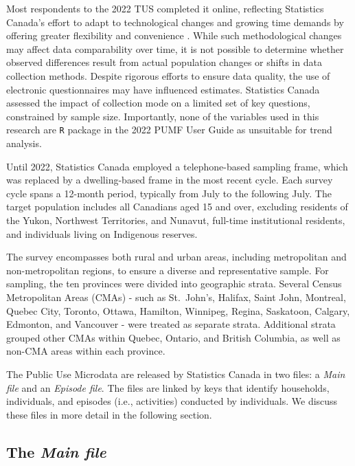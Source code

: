 \documentclass[Royal,times,sageh]{sagej}
\begin{document}
Most respondents to the 2022 TUS completed it online, reflecting
Statistics Canada's effort to adapt to technological changes and growing
time demands by offering greater flexibility and convenience
\citep{statisticscanada2022}. While such methodological changes may
affect data comparability over time, it is not possible to determine
whether observed differences result from actual population changes or
shifts in data collection methods. Despite rigorous efforts to ensure
data quality, the use of electronic questionnaires may have influenced
estimates. Statistics Canada assessed the impact of collection mode on a
limited set of key questions, constrained by sample size. Importantly,
none of the variables used in this research are \texttt{R} package in
the 2022 PUMF User Guide as unsuitable for trend analysis.

Until 2022, Statistics Canada employed a telephone-based sampling frame,
which was replaced by a dwelling-based frame in the most recent cycle.
Each survey cycle spans a 12-month period, typically from July to the
following July. The target population includes all Canadians aged 15 and
over, excluding residents of the Yukon, Northwest Territories, and
Nunavut, full-time institutional residents, and individuals living on
Indigenous reserves.

The survey encompasses both rural and urban areas, including
metropolitan and non-metropolitan regions, to ensure a diverse and
representative sample. For sampling, the ten provinces were divided into
geographic strata. Several Census Metropolitan Areas (CMAs) - such as
St.~John's, Halifax, Saint John, Montreal, Quebec City, Toronto, Ottawa,
Hamilton, Winnipeg, Regina, Saskatoon, Calgary, Edmonton, and Vancouver
- were treated as separate strata. Additional strata grouped other CMAs
within Quebec, Ontario, and British Columbia, as well as non-CMA areas
within each province.

The Public Use Microdata are released by Statistics Canada in two files:
a \emph{Main file} and an \emph{Episode file}. The files are linked by
keys that identify households, individuals, and episodes (i.e.,
activities) conducted by individuals. We discuss these files in more
detail in the following section.

\subsection{\texorpdfstring{The \emph{Main
file}}{The Main file}}\label{the-main-file}
\end{document}
